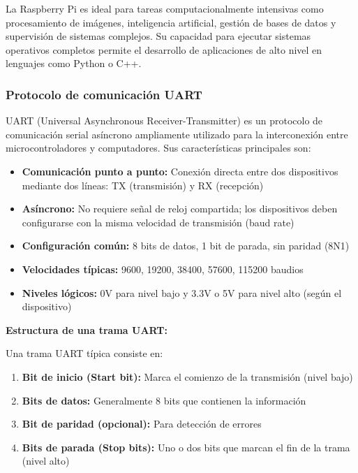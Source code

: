 La Raspberry Pi es ideal para tareas computacionalmente intensivas como procesamiento de imágenes, inteligencia artificial, gestión de bases de datos y supervisión de sistemas complejos. Su capacidad para ejecutar sistemas operativos completos permite el desarrollo de aplicaciones de alto nivel en lenguajes como Python o C++.

\subsubsection{Protocolo de comunicación UART}

UART (Universal Asynchronous Receiver-Transmitter) es un protocolo de comunicación serial asíncrono ampliamente utilizado para la interconexión entre microcontroladores y computadores. Sus características principales son:

\begin{itemize}
    \item \textbf{Comunicación punto a punto:} Conexión directa entre dos dispositivos mediante dos líneas: TX (transmisión) y RX (recepción)
    \item \textbf{Asíncrono:} No requiere señal de reloj compartida; los dispositivos deben configurarse con la misma velocidad de transmisión (baud rate)
    \item \textbf{Configuración común:} 8 bits de datos, 1 bit de parada, sin paridad (8N1)
    \item \textbf{Velocidades típicas:} 9600, 19200, 38400, 57600, 115200 baudios
    \item \textbf{Niveles lógicos:} 0V para nivel bajo y 3.3V o 5V para nivel alto (según el dispositivo)
\end{itemize}

\textbf{Estructura de una trama UART:}

Una trama UART típica consiste en:
\begin{enumerate}
    \item \textbf{Bit de inicio (Start bit):} Marca el comienzo de la transmisión (nivel bajo)
    \item \textbf{Bits de datos:} Generalmente 8 bits que contienen la información
    \item \textbf{Bit de paridad (opcional):} Para detección de errores
    \item \textbf{Bits de parada (Stop bits):} Uno o dos bits que marcan el fin de la trama (nivel alto)
\end{enumerate}
